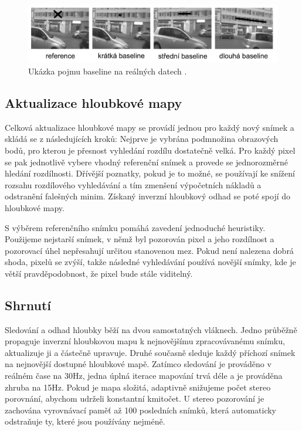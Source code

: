 \documentclass[12pt,a4paper]{report}
\begin{document}
\begin{figure}[H]
\centering
\includegraphics[scale=0.4]{img/baseline.jpg}
\caption{Ukázka pojmu baseline na reálných datech \cite{Semi-Dense_VO}.}
\end{figure}

\subsection*{Aktualizace hloubkové mapy}
Celková aktualizace hloubkové mapy se provádí jednou pro každý nový snímek a skládá se z následujících kroků: Nejprve je vybrána podmnožina obrazových bodů, pro kterou je přesnost vyhledání rozdílu dostatečně velká. Pro každý pixel se pak jednotlivě vybere vhodný referenční snímek a provede se jednorozměrné hledání rozdílnosti. Dřívější poznatky, pokud je to možné, se používají ke snížení rozsahu rozdílového vyhledávání a tím zmenšení výpočetních nákladů a odstranění falešných minim. Získaný inverzní hloubkový odhad se poté spojí do hloubkové mapy.

S výběrem referenčního snímku pomáhá zavedení jednoduché heuristiky. Použijeme nejstarší snímek, v němž byl pozorován pixel a jeho rozdílnost a pozorovací úhel nepře\-sahují určitou stanovenou mez. Pokud není nalezena dobrá shoda,  pixelů se zvýší, takže následné vyhledávání používá novější snímky, kde je větší pravděpodobnost, že pixel bude stále viditelný.


\subsection*{Shrnutí}
Sledování a odhad hloubky běží na dvou samostatných vláknech. Jedno průběžně propaguje inverzní hloubkovou mapu k nejnovějšímu zpracovávanému snímku, aktualizuje ji a částečně upravuje. Druhé současně sleduje každý příchozí snímek na nejnovější dostupné hloubkové mapě. Zatímco sledování je prováděno v reálném čase na 30Hz, jedna úplná iterace mapování trvá déle a je prováděna zhruba na 15Hz. Pokud je mapa složitá, adaptivně snižujeme počet stereo porovnání, abychom udrželi konstantní kmitočet. U stereo pozorování je zachována vyrovnávací paměť až 100 posledních snímků, která automaticky odstraňuje ty, které jsou používány nejméně.
\end{document}
